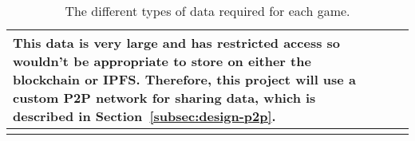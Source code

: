 \begin{longtable}{ p{} p{} p{} p{} }
  \vspace{1mm}
  \small This data is very large and has restricted access so wouldn't be appropriate to store on either the blockchain or IPFS. Therefore, this project will use a custom P2P network for sharing data, which is described in Section~\ref{subsec:design-p2p}.
  \\\bottomrule\bottomrule
  \caption{The different types of data required for each game.}
  \label{tab:data}
\end{longtable}